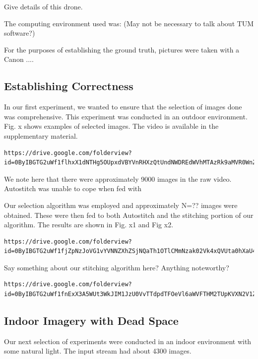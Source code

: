 \documentclass[10pt,twocolumn,letterpaper]{article}
\begin{document}
{\color{red} Give details of this drone.}

The computing environment used was: (May not be necessary to talk
about TUM software?)

For the purposes of establishing the ground truth, pictures were taken
with a Canon ....


\subsection{Establishing Correctness}

In our first experiment, we wanted to ensure that the selection of
images done was comprehensive.  This experiment was conducted in an
outdoor environment.  Fig. x  shows examples of selected
images.  The video is available in the supplementary material.

\begin{verbatim}
https://drive.google.com/folderview?id=0ByIBGTG2uWf1flhxX1dNTHg5OUpxdVBYVnRHXzQtUndNWDREdWVhMTAzRk9aMVR0WnZlV3c&usp=sharing
\end{verbatim}
We note here that there were approximately 9000 images in the raw
video.  Autostitch was unable to cope when fed with 

Our selection algorithm was employed and approximately N=?? images
were obtained.  These were then fed to both Autostitch and the
stitching portion of our algorithm.  The results are shown in Fig. x1
and Fig x2.

\begin{verbatim}
https://drive.google.com/folderview?id=0ByIBGTG2uWf1fjZpNzJoVG1vYVNNZXhZSjNQaTh1OTlCMmNzak02Vk4xQVUta0hXaU43bUE&usp=sharing
\end{verbatim}

{\color{red} Say something about our stitching algorithm here?
  Anything noteworthy?}

\begin{verbatim}
https://drive.google.com/folderview?id=0ByIBGTG2uWf1fnExX3A5WUt3WkJIM1JzU0VvTTdpdTFOeVl6aWVFTHM2TUpKVXN2V1ZoYm8&usp=drive_web
\end{verbatim}

\subsection{Indoor Imagery with Dead Space} 

Our next selection of experiments were conducted in an indoor
environment with some natural light.  The input stream had about 4300
images.  
\end{document}
